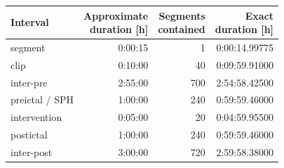 \setlength{\tabcolsep}{10pt}
\renewcommand{\arraystretch}{1.15}

\begin{tabular}{l r r r}
    \toprule
    \textbf{Interval} &
    \makecell[c]{\textbf{Approximate}\\\textbf{duration [h]}} &
    \makecell[c]{\textbf{Segments}\\\textbf{contained}} &
    \makecell[c]{\textbf{Exact}\\\textbf{duration [h]}} \\
    \midrule
    segment             & 0:00:15 &   1 & 0:00:14.99775 \\
    clip                & 0:10:00 &  40 & 0:09:59.91000 \\
    inter-pre           & 2:55:00 & 700 & 2:54:58.42500 \\
    preictal / SPH      & 1:00:00 & 240 & 0:59:59.46000 \\
    intervention        & 0:05:00 &  20 & 0:04:59.95500 \\
    postictal           & 1:00:00 & 240 & 0:59:59.46000 \\
    inter-post          & 3:00:00 & 720 & 2:59:58.38000 \\
    \bottomrule
\end{tabular}

